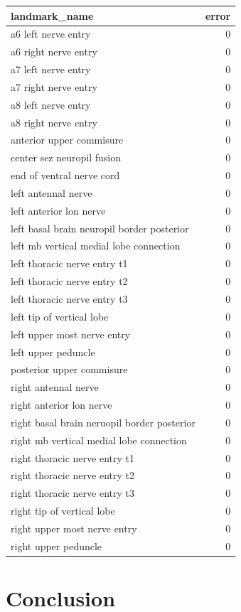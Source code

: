 \documentclass{article}
\begin{document}
	\begin{tabular}{lr}
		\toprule
		landmark\_name                               &   error \\
		\midrule
		a6 left nerve entry                         &       0 \\
		a6 right nerve entry                        &       0 \\
		a7 left nerve entry                         &       0 \\
		a7 right nerve entry                        &       0 \\
		a8 left nerve entry                         &       0 \\
		a8 right nerve entry                        &       0 \\
		anterior upper commisure                    &       0 \\
		center sez neuropil fusion                  &       0 \\
		end of ventral nerve cord                   &       0 \\
		left antennal nerve                         &       0 \\
		left anterior lon nerve                     &       0 \\
		left basal brain neuropil border posterior  &       0 \\
		left mb vertical medial lobe connection     &       0 \\
		left thoracic nerve entry t1                &       0 \\
		left thoracic nerve entry t2                &       0 \\
		left thoracic nerve entry t3                &       0 \\
		left tip of vertical lobe                   &       0 \\
		left upper most nerve entry                 &       0 \\
		left upper peduncle                         &       0 \\
		posterior upper commisure                   &       0 \\
		right antennal nerve                        &       0 \\
		right anterior lon nerve                    &       0 \\
		right basal brain neruopil border posterior &       0 \\
		right mb vertical medial lobe connection    &       0 \\
		right thoracic nerve entry t1               &       0 \\
		right thoracic nerve entry t2               &       0 \\
		right thoracic nerve entry t3               &       0 \\
		right tip of vertical lobe                  &       0 \\
		right upper most nerve entry                &       0 \\
		right upper peduncle                        &       0 \\
		\bottomrule
	\end{tabular}
	
	\section{Conclusion}
	
	\newpage
	
	
\end{document}

